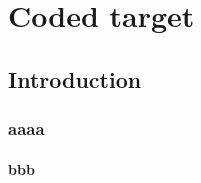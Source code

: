 \chapter{Coded target}
\label{Chap:CodedTarget}



\section{Introduction}


\subsection{aaaa}


\subsubsection{bbb}


